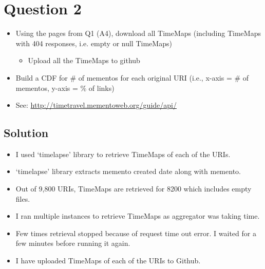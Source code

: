 
\section{Question 2}
\label{part2}
\begin{itemize} 
\item Using the pages from Q1 (A4), download all TimeMaps (including TimeMaps with 404 responses, i.e. empty or null TimeMaps) 
\begin{itemize}
\item Upload all the TimeMaps to github
\end{itemize}

\item Build a CDF for \# of mementos for each original URI (i.e., x-axis = \# of mementos, y-axis = \% of links)
\item See: \url {http://timetravel.mementoweb.org/guide/api/} 

\end{itemize}
\subsection{Solution}
\begin{itemize}
 \item I used `timelapse'\cite{timelapse} library to retrieve TimeMaps of each of the URIs.
 \item `timelapse'\cite{timelapse} library extracts memento created date along with memento.
 \item Out of 9,800 URIs, TimeMaps are retrieved for 8200 which includes empty files.
 \item I ran multiple instances to retrieve TimeMaps as aggregator was taking time.
 \item Few times retrieval stopped because of request time out error. I waited for a few minutes before running it again.
 \item I have uploaded TimeMaps of each of the URIs to Github.
\end{itemize}



